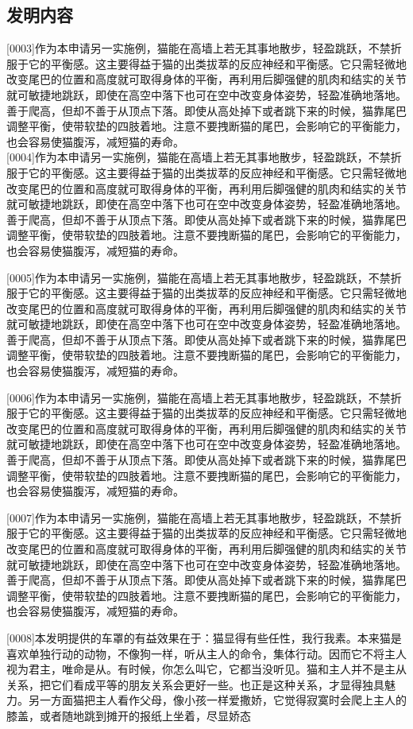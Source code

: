 \documentclass[hyperref]{ctexart}
\begin{document}
	\subsection*{发明内容}
	\begin{flushleft}
		{\large [0003]\quad 作为本申请另一实施例，猫能在高墙上若无其事地散步，轻盈跳跃，不禁折服于它的平衡感。这主要得益于猫的出类拔萃的反应神经和平衡感。它只需轻微地改变尾巴的位置和高度就可取得身体的平衡，再利用后脚强健的肌肉和结实的关节就可敏捷地跳跃，即使在高空中落下也可在空中改变身体姿势，轻盈准确地落地。善于爬高，但却不善于从顶点下落。即使从高处掉下或者跳下来的时候，猫靠尾巴调整平衡，使带软垫的四肢着地。注意不要拽断猫的尾巴，会影响它的平衡能力，也会容易使猫腹泻，减短猫的寿命。\\
			
			[0004]\quad 作为本申请另一实施例，猫能在高墙上若无其事地散步，轻盈跳跃，不禁折服于它的平衡感。这主要得益于猫的出类拔萃的反应神经和平衡感。它只需轻微地改变尾巴的位置和高度就可取得身体的平衡，再利用后脚强健的肌肉和结实的关节就可敏捷地跳跃，即使在高空中落下也可在空中改变身体姿势，轻盈准确地落地。善于爬高，但却不善于从顶点下落。即使从高处掉下或者跳下来的时候，猫靠尾巴调整平衡，使带软垫的四肢着地。注意不要拽断猫的尾巴，会影响它的平衡能力，也会容易使猫腹泻，减短猫的寿命。
			
			[0005]\quad 作为本申请另一实施例，猫能在高墙上若无其事地散步，轻盈跳跃，不禁折服于它的平衡感。这主要得益于猫的出类拔萃的反应神经和平衡感。它只需轻微地改变尾巴的位置和高度就可取得身体的平衡，再利用后脚强健的肌肉和结实的关节就可敏捷地跳跃，即使在高空中落下也可在空中改变身体姿势，轻盈准确地落地。善于爬高，但却不善于从顶点下落。即使从高处掉下或者跳下来的时候，猫靠尾巴调整平衡，使带软垫的四肢着地。注意不要拽断猫的尾巴，会影响它的平衡能力，也会容易使猫腹泻，减短猫的寿命。
			
			[0006]\quad 作为本申请另一实施例，猫能在高墙上若无其事地散步，轻盈跳跃，不禁折服于它的平衡感。这主要得益于猫的出类拔萃的反应神经和平衡感。它只需轻微地改变尾巴的位置和高度就可取得身体的平衡，再利用后脚强健的肌肉和结实的关节就可敏捷地跳跃，即使在高空中落下也可在空中改变身体姿势，轻盈准确地落地。善于爬高，但却不善于从顶点下落。即使从高处掉下或者跳下来的时候，猫靠尾巴调整平衡，使带软垫的四肢着地。注意不要拽断猫的尾巴，会影响它的平衡能力，也会容易使猫腹泻，减短猫的寿命。
			
			[0007]\quad 作为本申请另一实施例，猫能在高墙上若无其事地散步，轻盈跳跃，不禁折服于它的平衡感。这主要得益于猫的出类拔萃的反应神经和平衡感。它只需轻微地改变尾巴的位置和高度就可取得身体的平衡，再利用后脚强健的肌肉和结实的关节就可敏捷地跳跃，即使在高空中落下也可在空中改变身体姿势，轻盈准确地落地。善于爬高，但却不善于从顶点下落。即使从高处掉下或者跳下来的时候，猫靠尾巴调整平衡，使带软垫的四肢着地。注意不要拽断猫的尾巴，会影响它的平衡能力，也会容易使猫腹泻，减短猫的寿命。
			
			[0008]\quad 本发明提供的车罩的有益效果在于：猫显得有些任性，我行我素。本来猫是喜欢单独行动的动物，不像狗一样，听从主人的命令，集体行动。因而它不将主人视为君主，唯命是从。有时候，你怎么叫它，它都当没听见。猫和主人并不是主从关系，把它们看成平等的朋友关系会更好一些。也正是这种关系，才显得独具魅力。另一方面猫把主人看作父母，像小孩一样爱撒娇，它觉得寂寞时会爬上主人的膝盖，或者随地跳到摊开的报纸上坐着，尽显娇态}
		
	\end{flushleft}
\end{document}
